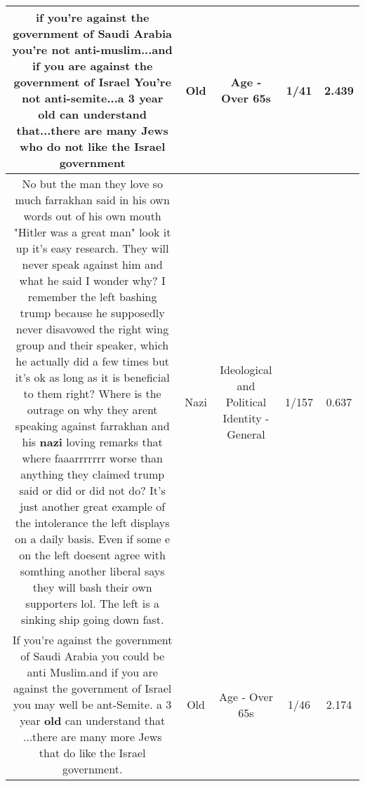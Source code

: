 \documentclass[11pt]{article}
\newlength\mylength
\begin{document}
\begin{center}
\begin{longtable}{|C{.65\mylength}|C{.30\mylength}|C{.12\mylength}|C{.12\mylength}|C{.12\mylength}|}
  \small if you're against the government of Saudi Arabia you're not anti-muslim...and if you are against the government of Israel You're not anti-semite...a 3 year \textbf{old} can understand that...there are many Jews who do not like the Israel government\normalsize   & Old & Age - Over 65s & 1/41 & 2.439 \\  \hline
  \small No but the man they love so much farrakhan said in his own words out of his own mouth "Hitler was a great man" look it up it's easy research. They will never speak against him and what he said I wonder why? I remember the left bashing trump because he supposedly never  disavowed the right wing group and their speaker, which he actually did a few times but it's ok as long as it is beneficial to them right? Where is the outrage on why they arent speaking against farrakhan and his \textbf{nazi} loving remarks that where faaarrrrrrr worse than anything they claimed trump said or did or did not do? It's just another great example of the intolerance the left displays on a daily basis. Even if some e on the left doesent agree with somthing another liberal says they will bash their own supporters lol. The left is a sinking ship going down fast.\normalsize   & Nazi &  Ideological and Political Identity - General & 1/157 & 0.637 \\  \hline
  \small If you're against the government of Saudi Arabia you could be anti Muslim.and if you are against the government of Israel you may well be ant-Semite. a 3 year \textbf{old} can understand that ...there are many more Jews that do like the Israel government.\normalsize   & Old & Age - Over 65s & 1/46 & 2.174 \\  \hline

\end{longtable}
\end{center}
\end{document}
